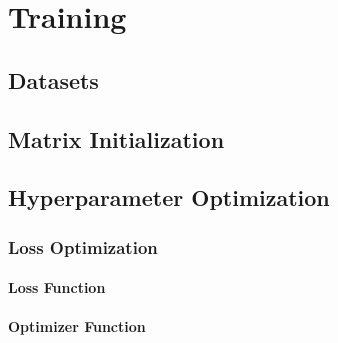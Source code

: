 \chapter{Training}

\section{Datasets}


\section{Matrix Initialization}

\section{Hyperparameter Optimization}

\subsection{Loss Optimization}

\subsubsection{Loss Function}

\subsubsection{Optimizer Function}
